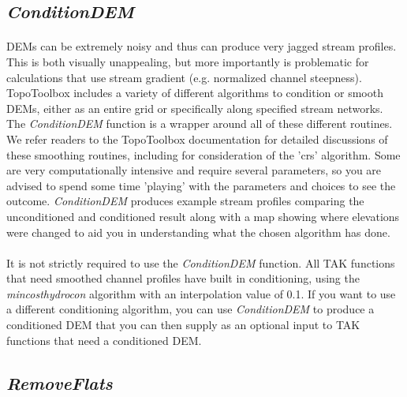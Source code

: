 \subsection{\textit{ConditionDEM}}

\paragraph{}DEMs can be extremely noisy and thus can produce very jagged stream profiles. This is both visually unappealing, but more importantly is problematic for calculations that use stream gradient (e.g. normalized channel steepness). TopoToolbox includes a variety of different algorithms to condition or smooth DEMs, either as an entire grid or specifically along specified stream networks. The \textit{ConditionDEM} function is a wrapper around all of these different routines. We refer readers to the TopoToolbox documentation for detailed discussions of these smoothing routines, including \cite{Schwanghart2017} for consideration of the 'crs' algorithm. Some are very computationally intensive and require several parameters, so you are advised to spend some time 'playing' with the parameters and choices to see the outcome. \textit{ConditionDEM} produces example stream profiles comparing the unconditioned and conditioned result along with a map showing where elevations were changed to aid you in understanding what the chosen algorithm has done. 

\paragraph{}It is not strictly required to use the \textit{ConditionDEM} function. All TAK functions that need smoothed channel profiles have built in conditioning, using the \textit{mincosthydrocon} algorithm with an interpolation value of 0.1. If you want to use a different conditioning algorithm, you can use \textit{ConditionDEM} to produce a conditioned DEM that you can then supply as an optional input to TAK functions that need a conditioned DEM.

\subsection{\textit{RemoveFlats}}

